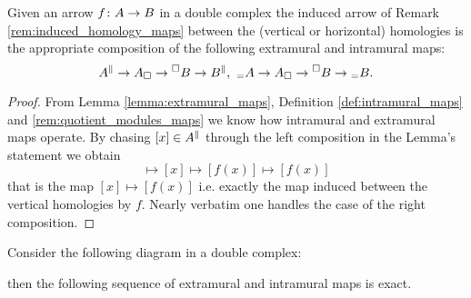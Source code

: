 \begin{lemma}
  \label{lemma:induced_and_extramural}
  Given an arrow \(f\colon A\to B\) in a double complex the induced arrow of Remark \ref{rem:induced_homology_maps} between the (vertical or horizontal) homologies is the appropriate composition of the following extramural and intramural maps:
  \begin{equation*}
    \vh{A}\to\don{A}\to\rec{B}\to\vh{B},\ \hh{A}\to\don{A}\to\rec{B}\to\hh{B}.
  \end{equation*}
\end{lemma}

\begin{proof}
  From Lemma \ref{lemma:extramural_maps}, Definition \ref{def:intramural_maps} and \ref{rem:quotient_modules_maps} we know how intramural and extramural maps operate. By chasing \([x]\in{A}^{\parallel}\) through the left composition in the Lemma's statement we obtain
  \begin{equation*}
    [x]\mapsto [x]\mapsto[f(x)]\mapsto[f(x)]
  \end{equation*}
  that is the map \([x]\mapsto[f(x)]\) i.e. exactly the map induced between the vertical homologies by \(f\). Nearly verbatim one handles the case of the right composition.
\end{proof}

\begin{lemma}
  \label{lemma:salamander}
  Consider the following diagram in a double complex:
  \begin{center}
  \end{center}
  then the following sequence of extramural and intramural maps is exact.
  \begin{center}
  \end{center}  
\end{lemma}

